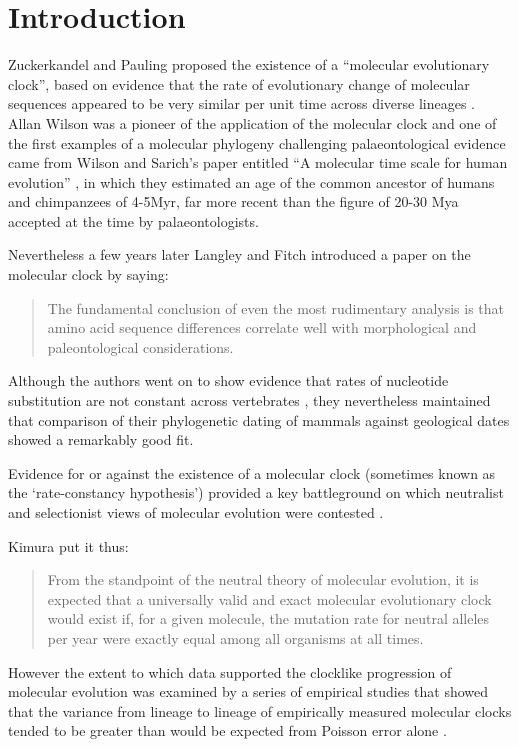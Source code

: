 \section{Introduction} 
Zuckerkandel and Pauling proposed the existence of a ``molecular evolutionary clock'', based on evidence that the rate of evolutionary change of molecular sequences appeared to be very similar per unit time across diverse lineages \cite{zuckerkandl1965}. Allan Wilson was a pioneer of the application of the molecular clock and one of the first examples of a molecular phylogeny challenging palaeontological evidence came from Wilson and Sarich's paper entitled ``A molecular time scale for human evolution'' \cite{WilsonSarich1969}, in which they estimated an age of the common ancestor of humans and chimpanzees of 4-5Myr, far more recent than the figure of 20-30 Mya accepted at the time by palaeontologists.

Nevertheless a few years later Langley and Fitch \cite{LangleyFitch1974} introduced a paper on the molecular clock by saying:

\begin{quotation}
The fundamental conclusion of even the most rudimentary analysis is that amino acid sequence differences correlate well with morphological and paleontological considerations.
\end{quotation}

Although the authors went on to show evidence that rates of nucleotide substitution are not constant across vertebrates \cite{LangleyFitch1974}, they nevertheless maintained that comparison of their phylogenetic dating of mammals against geological dates showed a remarkably good fit. 

Evidence for or against the existence of a molecular clock (sometimes known as the `rate-constancy hypothesis') provided a key battleground on which neutralist and selectionist views of molecular evolution were contested \cite{Kimura1987}.

Kimura \cite{Kimura1987} put it thus:

\begin{quotation}
From the standpoint of the neutral theory of molecular evolution, it is expected that a universally valid and exact molecular evolutionary clock would exist if, for a given molecule, the mutation rate for neutral alleles per year were exactly equal among all organisms at all times.
\end{quotation}
 
However the extent to which data supported the clocklike progression of molecular evolution was examined by a series of empirical studies that showed that the variance from lineage to lineage of empirically measured molecular clocks tended to be greater than would be expected from Poisson error alone \cite{LangleyFitch1974,Kimura1987}.

  
  
  
  
  
  
  
  
  
  
  
  
  
  
  
  
  
  
  
  
  
  
  
  
  